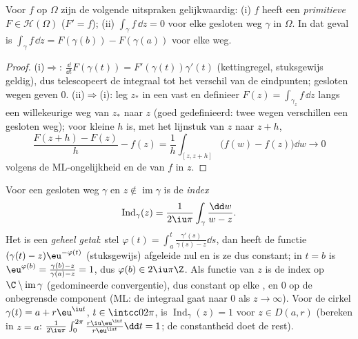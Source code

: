 \begin{proposition}[Primitieven]\label{prop:b3:holomorphic:primitive}
Voor  $f$ op $\Omega$ zijn de volgende uitspraken
gelijkwaardig: (i) $f$ heeft een \emph{primitieve} $F \in
\mathcal H(\Omega)$ ($F' = f$); (ii) $\int_\gamma f\,\dd z = 0$
voor elke gesloten weg $\gamma$ in $\Omega$. In dat geval is
$\int_\gamma f\,\dd z = F(\gamma(b)) - F(\gamma(a))$ voor elke
weg.
\end{proposition}

\begin{proof}
(i)$\Rightarrow$: $\frac{\dd}{\dd t}F(\gamma(t)) =
F'(\gamma(t))\gamma'(t)$ (kettingregel, stuksgewijs geldig), dus
telescopeert de integraal tot het verschil van de eindpunten;
gesloten wegen geven $0$. (ii)$\Rightarrow$(i): leg $z_*$ in een
 vast en definieer $F(z) = \int_{\gamma_z}f\,
\dd z$ langs een willekeurige weg van $z_*$ naar $z$ (goed
gedefinieerd: twee wegen verschillen een gesloten weg); voor
kleine $h$ is, met het lijnstuk van $z$ naar $z + h$,
\[
\frac{F(z + h) - F(z)}{h} - f(z)
= \frac1h\int_{[z, z+h]}\bigl(f(w) - f(z)\bigr)\dd w
\longrightarrow 0
\]
volgens de ML-ongelijkheid en de  van $f$ in $z$.
\end{proof}

\begin{definition}[Windingsgetal]\label{def:b3:holomorphic:index}
Voor een gesloten weg $\gamma$ en $z \notin
\operatorname{im}\gamma$ is de \emph{index}
\[
\operatorname{Ind}_\gamma(z) = \frac1{2\iu\pi}
\int_\gamma\frac{\dd w}{w - z} .
\]
Het is een \emph{geheel getal}: stel $\varphi(t) =
\int_a^t\frac{\gamma'(s)}{\gamma(s) - z}\dd s$, dan heeft de
functie $(\gamma(t) - z)\eu^{-\varphi(t)}$ (stuksgewijs)
afgeleide nul en is ze dus constant; in $t = b$ is
$\eu^{\varphi(b)} = \frac{\gamma(b) - z}{\gamma(a) - z} = 1$, dus
$\varphi(b) \in 2\iu\pi\Z$. Als functie van $z$ is de index
 op $\C\setminus\operatorname{im}\gamma$ (gedomineerde
convergentie), dus constant op elke , en $0$
op de onbegrensde component (ML: de integraal gaat naar $0$ als
$z \to \infty$). Voor de cirkel $\gamma(t) = a + r\eu^{\iu t}$,
$t \in \intcc0{2\pi}$, is $\operatorname{Ind}_\gamma(z) = 1$ voor
$z \in D(a,r)$ (bereken in $z = a$: $\frac1{2\iu\pi}
\int_0^{2\pi}\frac{r\iu\eu^{\iu t}}{r\eu^{\iu t}}\dd t = 1$; de
constantheid doet de rest).
\end{definition}

